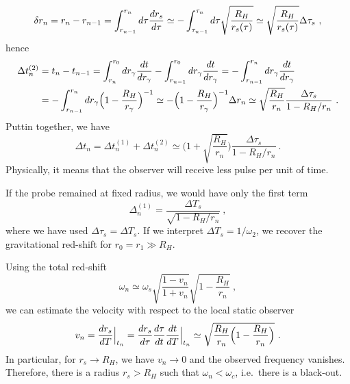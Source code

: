     \begin{equation*}
        \delta r_n = r_n - r_{n-1} = \int_{r_{n-1}}^{r_n} d\tau \frac{dr_s}{d\tau} \simeq - \int_{\tau_{n-1}}^{\tau_n} d\tau \sqrt{\frac{R_H}{r_s(\tau)}} \simeq \sqrt{\frac{R_H}{r_s(\tau)}}  \Delta \tau_s ~,
    \end{equation*}
    hence
    \begin{equation*}
    \begin{aligned}
        \Delta t_n^{(2)} & = t_n - t_{n-1} = \int_{r_n}^{r_0} dr_\gamma \frac{dt}{dr_\gamma} - \int_{r_{n-1}}^{r_0} dr_\gamma \frac{dt}{dr_\gamma} = - \int_{r_{n-1}}^{r_n} dr_\gamma \frac{dt}{dr_\gamma} \\ & = - \int_{r_{n-1}}^{r_n} dr_\gamma \Big ( 1 - \frac{R_H}{r_\gamma} \Big)^{-1} \simeq - \Big ( 1 - \frac{R_H}{r_\gamma} \Big)^{-1} \Delta r_n \simeq \sqrt{\frac{R_H}{r_n}} \frac{\Delta \tau_s}{1 - R_H/r_n} ~.
    \end{aligned}
    \end{equation*}
    Puttin together, we have 
    \begin{equation*}
        \Delta t_n = \Delta t_n^{(1)} + \Delta t_n^{(2)} \simeq \Big (1 + \sqrt{\frac{R_H}{r_n}}) \frac{\Delta \tau_s}{1 - R_H/r_n} ~.
    \end{equation*}
    Physically, it means that the observer will receive less pulse per unit of time. 

    If the probe remained at fixed radius, we would have only the first term 
    \begin{equation*}
        \Delta_n^{(1)} = \frac{\Delta T_s}{\sqrt{1 - R_H/r_n}} ~,
    \end{equation*}
    where we have used $\Delta \tau_s = \Delta T_s$.  If we interpret $\Delta T_s = 1 / \omega_2$, we recover the gravitational red-shift for $r_0 = r_1 \gg R_H$. 

    Using the total red-shift
    \begin{equation*}
        \omega_n \simeq \omega_s \sqrt{\frac{1-v_n}{1+v_n}} \sqrt{1 - \frac{R_H}{r_n}} ~,
    \end{equation*}
    we can estimate the velocity with respect to the local static observer 
    \begin{equation*}
        v_n = \frac{dr_s}{dT} \Big \vert_{t_n} = \frac{dr_s}{d\tau} \frac{d\tau}{dt} \frac{dt}{dT} \Big \vert_{t_n} \simeq \sqrt{\frac{R_H}{r_n} \Big (1 - \frac{R_H}{r_n} \Big )} ~.
    \end{equation*}
    In particular, for $r_s \rightarrow R_H$, we have $v_n \rightarrow 0$ and the observed frequency vanishes. Therefore, there is a radius $r_s > R_H$ such that $\omega_n < \omega_c$, i.e.~there is a black-out.

